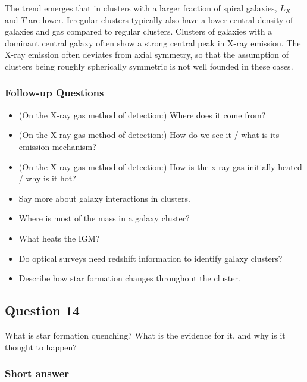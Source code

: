 \documentclass[a4paper,11pt]{article}
\begin{document}
{\noindent}The trend emerges that in clusters with a larger fraction of spiral galaxies, $L_X$ and $T$ are lower. Irregular clusters typically also have a lower central density of galaxies and gas compared to regular clusters. Clusters of galaxies with a dominant central galaxy often show a strong central peak in X-ray emission. The X-ray emission often deviates from axial symmetry, so that the assumption of clusters being roughly spherically symmetric is not well founded in these cases.

\subsubsection{Follow-up Questions}

\begin{itemize}
    \item (On the X-ray gas method of detection:) Where does it come from?
    \item (On the X-ray gas method of detection:) How do we see it / what is its emission mechanism?
    \item (On the X-ray gas method of detection:) How is the x-ray gas initially heated / why is it hot?
    \item Say more about galaxy interactions in clusters.
    \item Where is most of the mass in a galaxy cluster?
    \item What heats the IGM?
    \item Do optical surveys need redshift information to identify galaxy clusters?
    \item Describe how star formation changes throughout the cluster.
    \end{itemize}




\newpage
\subsection{Question 14}

What is star formation quenching? What is the evidence for it, and why is it thought to happen?

\subsubsection{Short answer}
\end{document}
